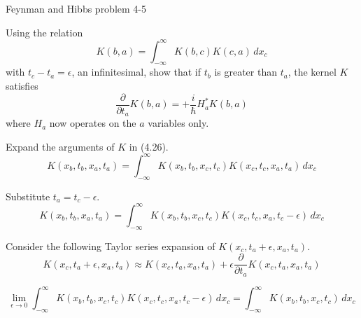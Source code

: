 \documentclass[12pt]{article}
\begin{document}
\begin{center}
Feynman and Hibbs problem 4-5
\end{center}

Using the relation
\begin{equation*}
K(b,a)=\int_{-\infty}^\infty K(b,c)K(c,a)\,dx_c
\tag{4.26}
\end{equation*}
with $t_c-t_a=\epsilon$, an infinitesimal, show that if $t_b$ is greater than $t_a$,
the kernel $K$ satisfies
\begin{equation*}
\frac{\partial}{\partial t_a}K(b,a)=+\frac{i}{\hbar}H_a^*K(b,a)
\end{equation*}
where $H_a$ now operates on the $a$ variables only.

\bigskip
Expand the arguments of $K$ in (4.26).
\begin{equation*}
K(x_b,t_b,x_a,t_a)=\int_{-\infty}^\infty K(x_b,t_b,x_c,t_c)K(x_c,t_c,x_a,t_a)\,dx_c
\end{equation*}

Substitute $t_a=t_c-\epsilon$.
\begin{equation*}
K(x_b,t_b,x_a,t_a)=\int_{-\infty}^\infty K(x_b,t_b,x_c,t_c)K(x_c,t_c,x_a,t_c-\epsilon)\,dx_c
\end{equation*}

Consider the following Taylor series expansion of $K(x_c,t_a+\epsilon,x_a,t_a)$.
\begin{equation*}
K(x_c,t_a+\epsilon,x_a,t_a)\approx K(x_c,t_a,x_a,t_a)+\epsilon\frac{\partial}{\partial t_a}K(x_c,t_a,x_a,t_a)
\end{equation*}

\begin{equation*}
\lim_{\epsilon\rightarrow0}\int_{-\infty}^\infty K(x_b,t_b,x_c,t_c)K(x_c,t_c,x_a,t_c-\epsilon)\,dx_c
=\int_{-\infty}^\infty K(x_b,t_b,x_c,t_c)\,dx_c
\end{equation*}
\end{document}
